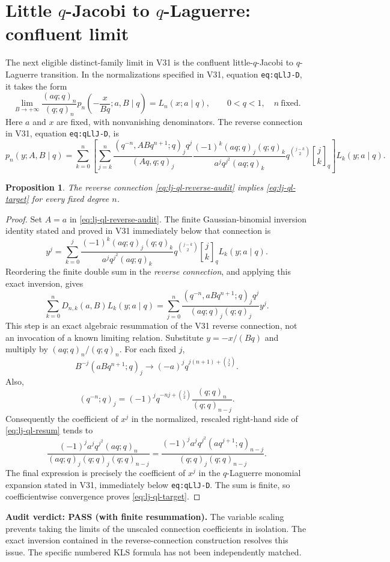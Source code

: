 \documentclass[11pt]{article}
\newtheorem{proposition}{Proposition}
\begin{document}
\section{Little $q$-Jacobi to $q$-Laguerre: confluent limit}
The next eligible distinct-family limit in V31 is the confluent
little-$q$-Jacobi to $q$-Laguerre transition. In the normalizations
specified in V31, equation \texttt{eq:qLlJ-D}, it takes the form
\begin{equation}\label{eq:lj-ql-target}
 \lim_{B\to+\infty}\frac{(aq;q)_n}{(q;q)_n}
 p_n\!\left(-\frac{x}{Bq};a,B\mid q\right)=L_n(x;a\mid q),
 \qquad 0<q<1,\quad n\ \text{fixed}.
\end{equation}
Here $a$ and $x$ are fixed, with nonvanishing denominators. The
reverse connection in V31, equation \texttt{eq:qLlJ-D}, is
\begin{equation}\label{eq:lj-ql-reverse-audit}
 p_n(y;A,B\mid q)=\sum_{k=0}^n\left[\sum_{j=k}^n
 \frac{(q^{-n},ABq^{n+1};q)_jq^j}{(Aq,q;q)_j}
 \frac{(-1)^k(aq;q)_j(q;q)_k}{a^jq^{j^2}(aq;q)_k}
 q^{\binom{j-k}{2}}{j\brack k}_q\right]L_k(y;a\mid q).
\end{equation}
\begin{proposition}
The reverse connection \eqref{eq:lj-ql-reverse-audit} implies
\eqref{eq:lj-ql-target} for every fixed degree $n$.
\end{proposition}
\begin{proof}
Set $A=a$ in \eqref{eq:lj-ql-reverse-audit}. The finite
Gaussian-binomial inversion identity stated and proved in V31 immediately
below that connection is
\[
 y^j=\sum_{k=0}^j
 \frac{(-1)^k(aq;q)_j(q;q)_k}{a^jq^{j^2}(aq;q)_k}
 q^{\binom{j-k}{2}}{j\brack k}_q L_k(y;a\mid q).
\]
Reordering the finite double sum in the \emph{reverse connection}, and
applying this exact inversion, gives
\begin{equation}\label{eq:lj-ql-resum}
 \sum_{k=0}^n D_{n,k}(a,B) L_k(y;a\mid q)
 =\sum_{j=0}^n\frac{(q^{-n},aBq^{n+1};q)_jq^j}
 {(aq;q)_j(q;q)_j}y^j.
\end{equation}
This step is an exact algebraic resummation of the V31 reverse
connection, not an invocation of a known limiting relation.
Substitute $y=-x/(Bq)$ and multiply by $(aq;q)_n/(q;q)_n$.
For each fixed $j$,
\[
 B^{-j}(aBq^{n+1};q)_j
 \longrightarrow (-a)^jq^{j(n+1)+\binom j2}.
\]
Also,
\[
 (q^{-n};q)_j=(-1)^jq^{-nj+\binom j2}
 \frac{(q;q)_n}{(q;q)_{n-j}}.
\]
Consequently the coefficient of $x^j$ in the normalized,
rescaled right-hand side of \eqref{eq:lj-ql-resum} tends to
\[
 \frac{(-1)^ja^jq^{j^2}(aq;q)_n}
 {(aq;q)_j(q;q)_j(q;q)_{n-j}}
 =\frac{(-1)^ja^jq^{j^2}(aq^{j+1};q)_{n-j}}
 {(q;q)_j(q;q)_{n-j}}.
\]
The final expression is precisely the coefficient of $x^j$ in
the $q$-Laguerre monomial expansion stated in V31, immediately below
\texttt{eq:qLlJ-D}. The sum is finite, so coefficientwise convergence
proves \eqref{eq:lj-ql-target}.
\end{proof}
\noindent\textbf{Audit verdict: PASS (with finite resummation).}
The variable scaling prevents taking the limits of the unscaled
connection coefficients in isolation. The exact inversion contained
in the reverse-connection construction resolves this issue. The
specific numbered KLS formula has not been independently matched.
\end{document}
